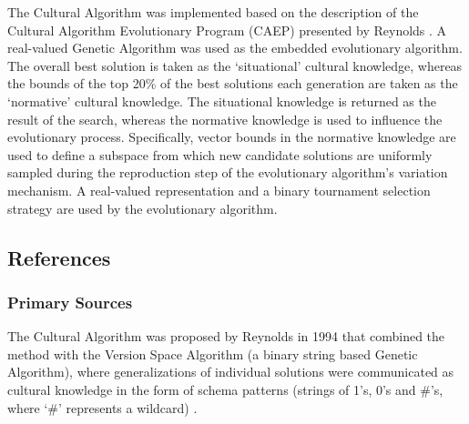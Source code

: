 The Cultural Algorithm was implemented based on the description of the Cultural Algorithm Evolutionary Program (CAEP) presented by Reynolds \cite{Reynolds1999}. 
A real-valued Genetic Algorithm was used as the embedded evolutionary algorithm.
The overall best solution is taken as the `situational' cultural knowledge, whereas the bounds of the top 20\% of the best solutions each generation are taken as the `normative' cultural knowledge. 
The situational knowledge is returned as the result of the search, whereas the normative knowledge is used to influence the evolutionary process. Specifically, vector bounds in the normative knowledge are used to define a subspace from which new candidate solutions are uniformly sampled during the reproduction step of the evolutionary algorithm's variation mechanism. 
A real-valued representation and a binary tournament selection strategy are used by the evolutionary algorithm.



\subsection{References}

% 
% 
\subsubsection{Primary Sources}
The Cultural Algorithm was proposed by Reynolds in 1994 that combined the method with the Version Space Algorithm (a binary string based Genetic Algorithm), where generalizations of individual solutions were communicated as cultural knowledge in the form of schema patterns (strings of 1's, 0's and \#'s, where `\#' represents a wildcard) \cite{Reynolds1994}. 

